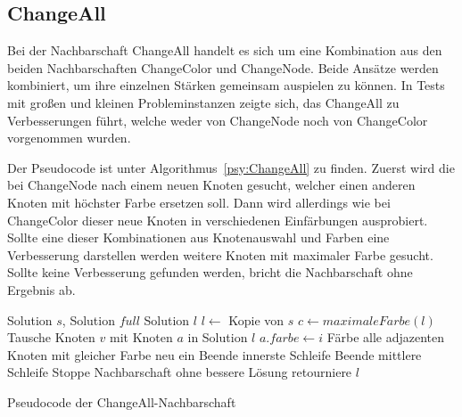 \subsection{ChangeAll}
\label{sec:changeall}
Bei der Nachbarschaft ChangeAll handelt es sich um eine Kombination aus den beiden Nachbarschaften ChangeColor und ChangeNode. Beide Ansätze werden kombiniert, um ihre einzelnen Stärken gemeinsam auspielen
zu können. In Tests mit großen und kleinen Probleminstanzen zeigte sich, das ChangeAll zu Verbesserungen führt, welche weder von ChangeNode noch von ChangeColor vorgenommen wurden.

Der Pseudocode ist unter Algorithmus~\ref{psy:ChangeAll} zu finden. Zuerst wird die bei ChangeNode nach einem neuen Knoten gesucht, welcher einen anderen Knoten mit höchster Farbe ersetzen soll. Dann wird
allerdings wie bei ChangeColor dieser neue Knoten in verschiedenen Einfärbungen ausprobiert. Sollte eine dieser Kombinationen aus Knotenauswahl und Farben eine Verbesserung darstellen werden weitere Knoten
mit maximaler Farbe gesucht. Sollte keine Verbesserung gefunden werden, bricht die Nachbarschaft ohne Ergebnis ab.

\begin{algorithm}
\begin{algorithmic}[1]
\Require Solution $s$, Solution $full$
\Ensure Solution $l$
\State $l \leftarrow$ Kopie von $s$
\State $c \leftarrow maximaleFarbe(l)$
\State Tausche Knoten $v$ mit Knoten $a$ in Solution $l$
\State $a.farbe \leftarrow i$
\State Färbe alle adjazenten Knoten mit gleicher Farbe neu ein
\State Beende innerste Schleife
\EndIf
\EndFor
{}
\State Beende mittlere Schleife
\EndIf
\EndFor
{}
\State Stoppe Nachbarschaft ohne bessere Lösung
\EndIf
\EndFor
\State retourniere $l$
\end{algorithmic}
\caption{Pseudocode der ChangeAll-Nachbarschaft}
\label{psy:ChangeAll}
\end{algorithm}
